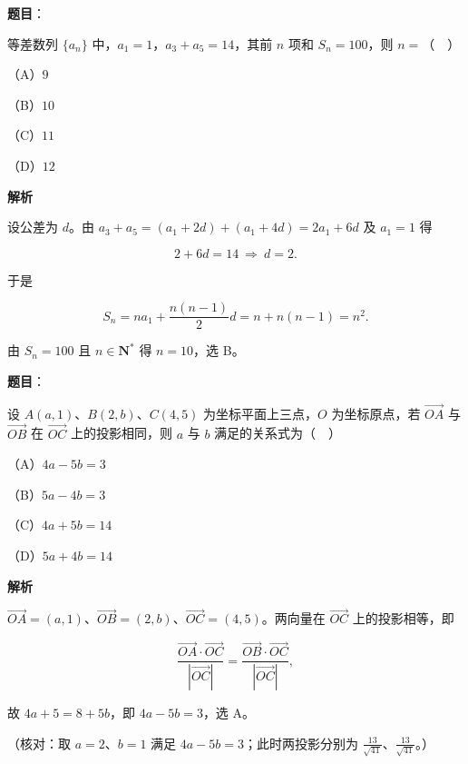 \begin{answer}

\textbf{题目}：

等差数列 $\{a_n\}$ 中，$a_1=1$，$a_3+a_5=14$，其前 $n$ 项和 $S_n=100$，则 $n=$（　）

（A）$9$

（B）$10$

（C）$11$

（D）$12$

\textbf{解析}

设公差为 $d$。由 $a_3+a_5=(a_1+2d)+(a_1+4d)=2a_1+6d$ 及 $a_1=1$ 得

\nopagebreak[4]
\[2+6d=14\ \Longrightarrow\ d=2 .\]

于是

\nopagebreak[4]
\[S_n=na_1+\frac{n(n-1)}{2}d=n+n(n-1)=n^2 .\]

由 $S_n=100$ 且 $n\in\mathbf N^*$ 得 $n=10$，选 B。


\end{answer}
\begin{answer}

\textbf{题目}：

设 $A(a,1)$、$B(2,b)$、$C(4,5)$ 为坐标平面上三点，$O$ 为坐标原点，若 $\overrightarrow{OA}$ 与 $\overrightarrow{OB}$ 在 $\overrightarrow{OC}$ 上的投影相同，则 $a$ 与 $b$ 满足的关系式为（　）

（A）$4a-5b=3$

（B）$5a-4b=3$

（C）$4a+5b=14$

（D）$5a+4b=14$

\textbf{解析}

$\overrightarrow{OA}=(a,1)$、$\overrightarrow{OB}=(2,b)$、$\overrightarrow{OC}=(4,5)$。两向量在 $\overrightarrow{OC}$ 上的投影相等，即

\nopagebreak[4]
\[\frac{\overrightarrow{OA}\cdot\overrightarrow{OC}}{|\overrightarrow{OC}|}=\frac{\overrightarrow{OB}\cdot\overrightarrow{OC}}{|\overrightarrow{OC}|},\]

故 $4a+5=8+5b$，即 $4a-5b=3$，选 A。

（核对：取 $a=2$、$b=1$ 满足 $4a-5b=3$；此时两投影分别为 $\frac{13}{\sqrt{41}}$、$\frac{13}{\sqrt{41}}$。）


\end{answer}
